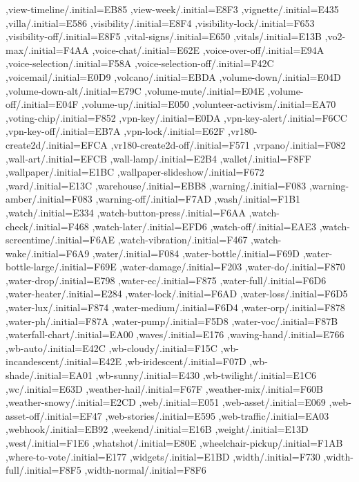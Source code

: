 { ,view-timeline/.initial=EB85
 ,view-week/.initial=E8F3
 ,vignette/.initial=E435
 ,villa/.initial=E586
 ,visibility/.initial=E8F4
 ,visibility-lock/.initial=F653
 ,visibility-off/.initial=E8F5
 ,vital-signs/.initial=E650
 ,vitals/.initial=E13B
 ,vo2-max/.initial=F4AA
 ,voice-chat/.initial=E62E
 ,voice-over-off/.initial=E94A
 ,voice-selection/.initial=F58A
 ,voice-selection-off/.initial=F42C
 ,voicemail/.initial=E0D9
 ,volcano/.initial=EBDA
 ,volume-down/.initial=E04D
 ,volume-down-alt/.initial=E79C
 ,volume-mute/.initial=E04E
 ,volume-off/.initial=E04F
 ,volume-up/.initial=E050
 ,volunteer-activism/.initial=EA70
 ,voting-chip/.initial=F852
 ,vpn-key/.initial=E0DA
 ,vpn-key-alert/.initial=F6CC
 ,vpn-key-off/.initial=EB7A
 ,vpn-lock/.initial=E62F
 ,vr180-create2d/.initial=EFCA
 ,vr180-create2d-off/.initial=F571
 ,vrpano/.initial=F082
 ,wall-art/.initial=EFCB
 ,wall-lamp/.initial=E2B4
 ,wallet/.initial=F8FF
 ,wallpaper/.initial=E1BC
 ,wallpaper-slideshow/.initial=F672
 ,ward/.initial=E13C
 ,warehouse/.initial=EBB8
 ,warning/.initial=F083
 ,warning-amber/.initial=F083
 ,warning-off/.initial=F7AD
 ,wash/.initial=F1B1
 ,watch/.initial=E334
 ,watch-button-press/.initial=F6AA
 ,watch-check/.initial=F468
 ,watch-later/.initial=EFD6
 ,watch-off/.initial=EAE3
 ,watch-screentime/.initial=F6AE
 ,watch-vibration/.initial=F467
 ,watch-wake/.initial=F6A9
 ,water/.initial=F084
 ,water-bottle/.initial=F69D
 ,water-bottle-large/.initial=F69E
 ,water-damage/.initial=F203
 ,water-do/.initial=F870
 ,water-drop/.initial=E798
 ,water-ec/.initial=F875
 ,water-full/.initial=F6D6
 ,water-heater/.initial=E284
 ,water-lock/.initial=F6AD
 ,water-loss/.initial=F6D5
 ,water-lux/.initial=F874
 ,water-medium/.initial=F6D4
 ,water-orp/.initial=F878
 ,water-ph/.initial=F87A
 ,water-pump/.initial=F5D8
 ,water-voc/.initial=F87B
 ,waterfall-chart/.initial=EA00
 ,waves/.initial=E176
 ,waving-hand/.initial=E766
 ,wb-auto/.initial=E42C
 ,wb-cloudy/.initial=F15C
 ,wb-incandescent/.initial=E42E
 ,wb-iridescent/.initial=F07D
 ,wb-shade/.initial=EA01
 ,wb-sunny/.initial=E430
 ,wb-twilight/.initial=E1C6
 ,wc/.initial=E63D
 ,weather-hail/.initial=F67F
 ,weather-mix/.initial=F60B
 ,weather-snowy/.initial=E2CD
 ,web/.initial=E051
 ,web-asset/.initial=E069
 ,web-asset-off/.initial=EF47
 ,web-stories/.initial=E595
 ,web-traffic/.initial=EA03
 ,webhook/.initial=EB92
 ,weekend/.initial=E16B
 ,weight/.initial=E13D
 ,west/.initial=F1E6
 ,whatshot/.initial=E80E
 ,wheelchair-pickup/.initial=F1AB
 ,where-to-vote/.initial=E177
 ,widgets/.initial=E1BD
 ,width/.initial=F730
 ,width-full/.initial=F8F5
 ,width-normal/.initial=F8F6
}

